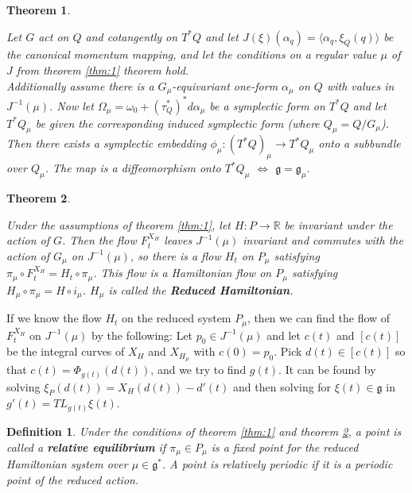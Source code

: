 \documentclass{article}
\newtheorem{thm}{Theorem}
\newtheorem{defn}{Definition}
\begin{document}
\begin{thm}\label{thm:4}

\indent Let $G$ act on $Q$ and cotangently on $T^*Q$ and let $J(\xi)(\alpha_q) = \langle \alpha_q, \xi_Q(q) \rangle$ be the canonical momentum mapping, and let the conditions on a regular value $\mu$ of $J$ from theorem \ref{thm:1} theorem hold. \\
\indent Additionally assume there is a $G_{\mu}$-equivariant one-form $\alpha_{\mu}$ on $Q$ with values in $J^{-1}(\mu)$. Now let $\Omega_{\mu} = \omega_0 + (\tau^*_Q)^* d \alpha_{\mu}$ be a symplectic form on $T^*Q$ and let $T^*Q_{\mu}$ be given the corresponding induced symplectic form (where $Q_{\mu} = Q/G_{\mu}$). 
\indent Then there exists a symplectic embedding $\phi_{\mu}: (T^*Q)_{\mu} \to T^* Q_{\mu} $ onto a subbundle over $Q_{\mu}$. The map is a diffeomorphism onto $T^*Q_{\mu}$ $\iff$ $\mathfrak{g}=\mathfrak{g}_{\mu}$.

\end{thm}

\begin{thm} \label{thm:2}

Under the assumptions of theorem \ref{thm:1}, let $H: P \to \mathbb{R}$ be invariant under the action of $G$. Then the flow $F^{X_H}_t$ leaves $J^{-1}(\mu)$ invariant and commutes with the action of $G_{\mu}$ on $J^{-1}(\mu)$, so there is a flow $H_t$ on $P_{\mu}$ satisfying $\pi_{\mu} \circ F^{X_H}_t = H_t \circ \pi_{\mu}$. This flow is a Hamiltonian flow on $P_{\mu}$ satisfying $H_{\mu} \circ \pi_{\mu} = H \circ i_{\mu}$. $H_{\mu}$ is called the \textbf{Reduced Hamiltonian}.

\end{thm}

If we know the flow $H_t$ on the reduced system $P_{\mu}$, then we can find the flow of $F^{X_H}_t$ on $J^{-1}(\mu)$ by the following: Let $p_0 \in J^{-1}(\mu)$ and let $c(t)$ and $[c(t)]$ be the integral curves of $X_H$ and $X_{H_{\mu}}$ with $c(0)=p_0$. Pick $d(t) \in [c(t)]$ so that $c(t) = \Phi_{g(t)} (d(t))$, and we try to find $g(t)$. It can be found by solving $\xi_P(d(t)) = X_H(d(t)) - d'(t)$ and then solving for $\xi(t) \in \mathfrak{g}$ in $g'(t) = TL_{g(t)} \xi(t)$.

\begin{defn}

Under the conditions of theorem \ref{thm:1} and theorem \ref{thm:2}, a point is called a \textbf{relative equilibrium} if $\pi_{\mu} \in P_{\mu}$ is a fixed point for the reduced Hamiltonian system over $\mu \in \mathfrak{g}^*$. A point is relatively periodic if it is a periodic point of the reduced action.
\end{defn}
\end{document}
